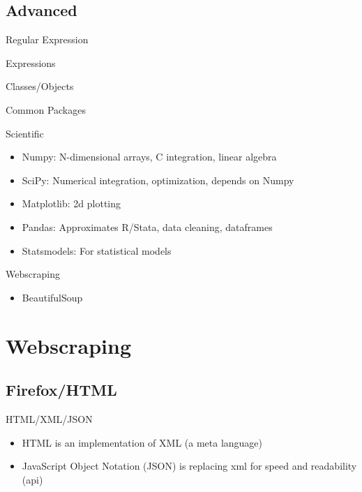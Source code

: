 \documentclass[presentation]{beamer}
\begin{document}
\subsection{Advanced}
\label{sec-4-2}

\begin{frame}[label=sec-4-2-1]{Regular Expression}
\end{frame}

\begin{frame}[label=sec-4-2-2]{Expressions}
\end{frame}

\begin{frame}[label=sec-4-2-3]{Classes/Objects}
\end{frame}

\begin{frame}[label=sec-4-2-4]{Common Packages}
\begin{block}{Scientific}
\begin{itemize}
\item Numpy: N-dimensional arrays, C integration, linear algebra
\item SciPy: Numerical integration, optimization, depends on Numpy
\item Matplotlib: 2d plotting
\item Pandas: Approximates R/Stata, data cleaning, dataframes
\item Statsmodels: For statistical models
\end{itemize}
\end{block}
\begin{block}{Webscraping}
\begin{itemize}
\item BeautifulSoup
\end{itemize}
\end{block}
\end{frame}


\section{Webscraping}
\label{sec-5}

\subsection{Firefox/HTML}
\label{sec-5-1}

\begin{frame}[label=sec-5-1-1]{HTML/XML/JSON}
\begin{itemize}
\item HTML is an implementation of XML (a meta language)
\item JavaScript Object Notation (JSON) is replacing xml for speed and readability (api)
\end{itemize}
\end{frame}
\end{document}
